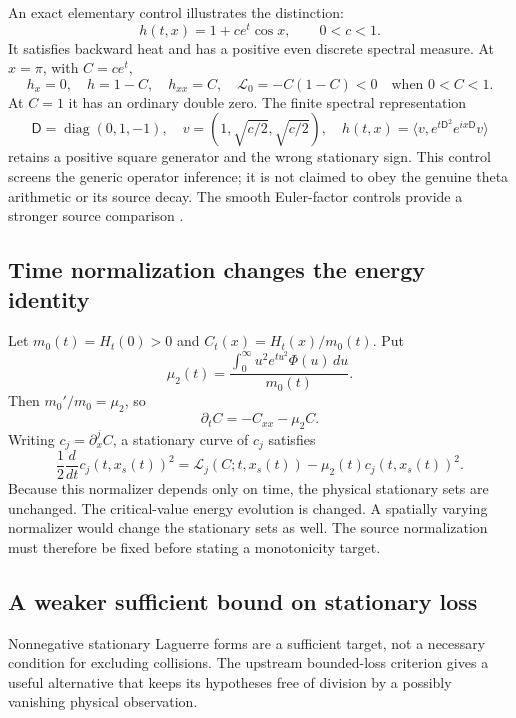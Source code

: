 \documentclass[11pt]{article}
\numberwithin{equation}{section}
\theoremstyle{definition}
\theoremstyle{remark}
\newcommand{\dd}{\,d}
\begin{document}
An exact elementary control illustrates the distinction:
\begin{equation}\label{eq:elementary-critical-control}
 h(t,x)=1+ce^t\cos x,\qquad 0<c<1.
\end{equation}
It satisfies backward heat and has a positive even discrete spectral
measure. At $x=\pi$, with $C=ce^t$,
\begin{equation}
 h_x=0,\quad h=1-C,\quad h_{xx}=C,\quad
 \mathscr L_0=-C(1-C)<0\quad\text{when }0<C<1.
\end{equation}
At $C=1$ it has an ordinary double zero. The finite spectral representation
\begin{equation}
 \mathsf D=\operatorname{diag}(0,1,-1),\quad
 v=(1,\sqrt{c/2},\sqrt{c/2}),\quad
 h(t,x)=\langle v,e^{t\mathsf D^2}e^{ix\mathsf D}v\rangle
\end{equation}
retains a positive square generator and the wrong stationary sign.
This control screens the generic operator inference; it is not claimed
to obey the genuine theta arithmetic or its source decay. The smooth
Euler-factor controls provide a stronger source comparison
\cite{eulercontrols,stationarycontrols}.

\subsection{Time normalization changes the energy identity}
Let $m_0(t)=H_t(0)>0$ and $C_t(x)=H_t(x)/m_0(t)$. Put
\begin{equation}
 \mu_2(t)=\frac{\int_0^\infty u^2e^{tu^2}\Phi(u)\dd u}{m_0(t)}.
\end{equation}
Then $m_0'/m_0=\mu_2$, so
\begin{equation}\label{eq:normalized-newman}
 \partial_t C=-C_{xx}-\mu_2 C.
\end{equation}
Writing $c_j=\partial_x^jC$, a stationary curve of $c_j$ satisfies
\begin{equation}\label{eq:normalized-critical-energy}
 \frac12\frac{d}{dt}c_j(t,x_s(t))^2
 =\mathscr L_j(C;t,x_s(t))-\mu_2(t)c_j(t,x_s(t))^2.
\end{equation}
Because this normalizer depends only on time, the physical stationary
sets are unchanged. The critical-value energy evolution is changed.
A spatially varying normalizer would change the stationary sets as well.
The source normalization must therefore be fixed before stating a
monotonicity target.

\subsection{A weaker sufficient bound on stationary loss}
Nonnegative stationary Laguerre forms are a sufficient target, not a
necessary condition for excluding collisions. The upstream bounded-loss
criterion \cite{boundedloss} gives a useful alternative that keeps its
hypotheses free of division by a possibly vanishing physical observation.
\end{document}
